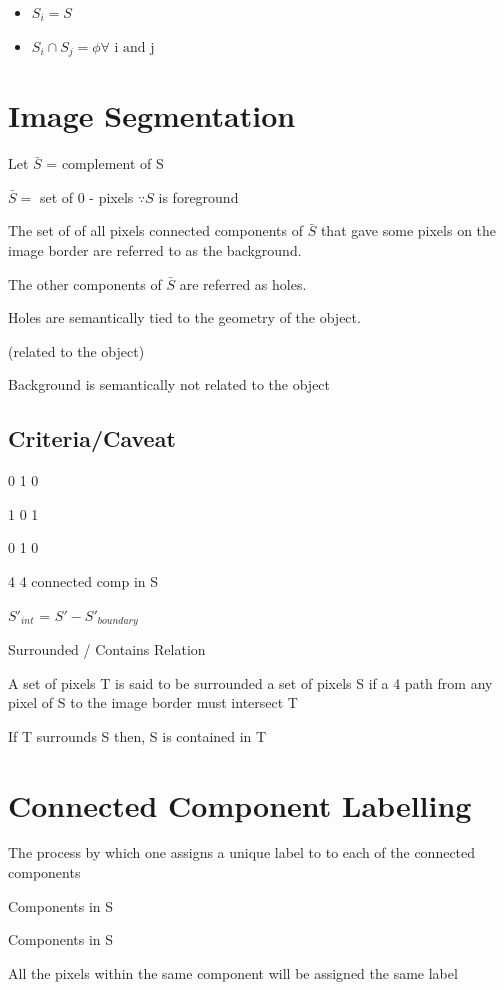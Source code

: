 \documentclass[11pt]{article}
\theoremstyle{definition}
\begin{document}
\begin{itemize}
\item $S_i = S$
\item $S_i \cap S_j = \phi \forall \text{ i and j}$
\end{itemize}

\newpage
\section{Image Segmentation}
Let $\bar S$  = complement of S

$\bar S =$ set of 0 - pixels $\because S$ is foreground

The set of of all pixels connected components of $\bar S$ that gave some pixels on the image border are referred to as the background.

The other components of $\bar S$  are referred as holes.

Holes are semantically tied to the geometry of the object.

(related to the object)

Background is semantically not related to the object

\subsection{Criteria/Caveat}

0 1 0 

1 0 1

0 1 0 

4 4 connected comp in S


$S\prime_{int}$ = $S' - S'_{boundary}$

Surrounded / Contains Relation 

A set of pixels T is  said to be surrounded a set of pixels S if a 4 path from any pixel of S to the image border must intersect T

If T surrounds S then, S is contained in T


\newpage
\section{Connected Component Labelling}
The process by which one assigns a unique label to to each of the connected components 

Components in S

Components in S 

All the pixels within the same component will be assigned the same label
\end{document}
